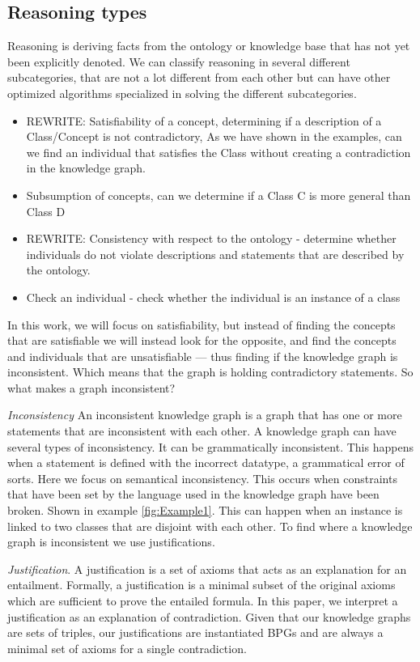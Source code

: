 \documentclass[11pt,letterpaper ,oneside ]{book}
\begin{document}
	\subsection{Reasoning types}
	Reasoning is deriving facts from the ontology or knowledge base that has not yet been explicitly denoted. We can classify reasoning in several different subcategories, that are not a lot different from each other but can have other optimized algorithms specialized in solving the different subcategories.
	\begin{itemize}
		\item REWRITE: Satisfiability of a concept, determining if a description of a Class/Concept is not contradictory, As we have shown in the examples, can we find an individual that satisfies the Class without creating a contradiction in the knowledge graph. 
		\item Subsumption of concepts, can we determine if a Class C is more general than Class D
		\item REWRITE: Consistency with respect to the ontology - determine whether individuals do not violate descriptions and statements that are described by the ontology.
		\item Check an individual - check whether the individual is an instance of a class
	\end{itemize}
	In this work, we will focus on satisfiability, but instead of finding the concepts that are satisfiable we will instead look for the opposite, and find the concepts and individuals that are unsatisfiable — thus finding if the knowledge graph is inconsistent. Which means that the graph is holding contradictory statements. So what makes a graph inconsistent?
	
	\textit{Inconsistency} An inconsistent knowledge graph is a graph that has one or more statements that are inconsistent with each other. A knowledge graph can have several types of inconsistency. It can be grammatically inconsistent. This happens when a statement is defined with the incorrect datatype, a grammatical error of sorts. Here we focus on semantical inconsistency. This occurs when constraints that have been set by the language used in the knowledge graph have been broken. Shown in example \ref{fig:Example1}. This can happen when an instance is linked to two classes that are disjoint with each other. To find where a knowledge graph is inconsistent we use justifications.   
	
	\textit{Justification}. A justification\cite{Horridge:2009} is a set of axioms that acts as an explanation for an entailment.
	Formally, a justification is a minimal subset of the original axioms which are sufficient to prove the entailed formula. In this paper, we interpret a justification as an explanation of contradiction. Given that our knowledge graphs are sets of triples, our justifications are instantiated BPGs and are always a minimal set of axioms for a single contradiction. \\
	
\end{document}
